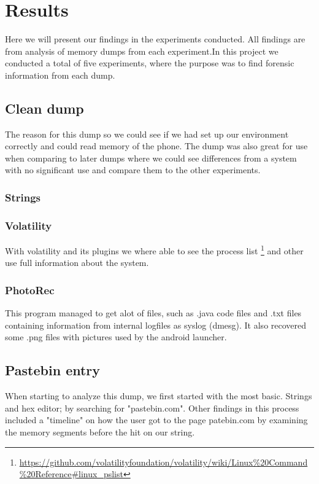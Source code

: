 \section{Results}
Here we will present our findings in the experiments conducted. All findings are
from analysis of memory dumps from each experiment.In this project we conducted 
a total of five experiments, where the purpose was to find forensic information 
from each dump.

\subsection{Clean dump}
The reason for this dump so we could see if we had set up our environment 
correctly and could read memory of the phone. The dump was also great for use 
when comparing to later dumps where we could see differences from a system with 
no significant use and compare them to the other experiments.

  \subsubsection{Strings}

  \subsubsection{Volatility}
  With volatility and its plugins we where able to see the process list
  \footnote{\url{https://github.com/volatilityfoundation/volatility/wiki/Linux\%20Command\%20Reference\#linux\_pslist}} 
  and other use full information about the system.

  \subsubsection{PhotoRec}
  This program managed to get alot of files, such as .java code files and .txt 
  files containing information from internal logfiles as syslog (dmesg). It also 
  recovered some .png files with pictures used by the android launcher.

\subsection{Pastebin entry}
When starting to analyze this dump, we first started with the most basic. 
Strings and hex editor; by searching for "pastebin.com". Other findings in this 
process included a "timeline" on how the user got to the page patebin.com by 
examining the memory segments before the hit on our string.

